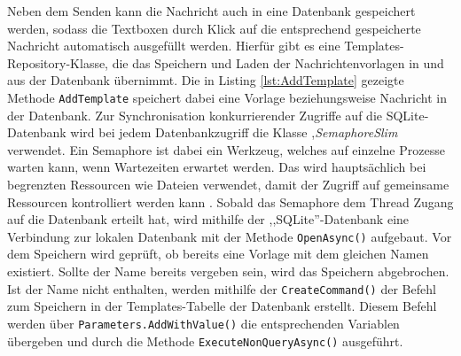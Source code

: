  Neben dem Senden kann die Nachricht auch in eine Datenbank gespeichert werden, sodass die Textboxen durch Klick auf die entsprechend gespeicherte Nachricht automatisch ausgefüllt werden. Hierfür gibt es eine Templates-Repository-Klasse, die das Speichern und Laden der Nachrichtenvorlagen in und aus der  Datenbank übernimmt. Die in Listing \ref{lst:AddTemplate} gezeigte Methode \lstinline|AddTemplate| speichert 
 dabei eine Vorlage beziehungsweise Nachricht  in der Datenbank. Zur Synchronisation konkurrierender Zugriffe auf die SQLite-Datenbank wird bei jedem Datenbankzugriff die Klasse ,\textit{SemaphoreSlim} verwendet. Ein Semaphore ist dabei ein Werkzeug, welches auf einzelne Prozesse warten kann, wenn Wartezeiten erwartet werden. Das wird hauptsächlich bei begrenzten Ressourcen wie Dateien verwendet, 
 damit der Zugriff auf gemeinsame Ressourcen kontrolliert werden kann \autocite{billwagnerSemaphorUndSemaphoreSlim}. Sobald das Semaphore dem Thread Zugang auf die Datenbank erteilt hat, wird mithilfe der ,,SQLite''-Datenbank eine Verbindung zur lokalen Datenbank mit der Methode \lstinline|OpenAsync()| aufgebaut. Vor dem Speichern wird geprüft, ob bereits eine Vorlage mit dem gleichen Namen existiert. Sollte der Name bereits vergeben sein, 
 wird das Speichern abgebrochen. Ist der Name nicht enthalten, werden mithilfe der \lstinline|CreateCommand()| der Befehl zum Speichern in der Templates-Tabelle der Datenbank erstellt. Diesem Befehl werden über \lstinline|Parameters.AddWithValue()| die entsprechenden Variablen übergeben und durch die Methode \lstinline|ExecuteNonQueryAsync()| ausgeführt.
 
